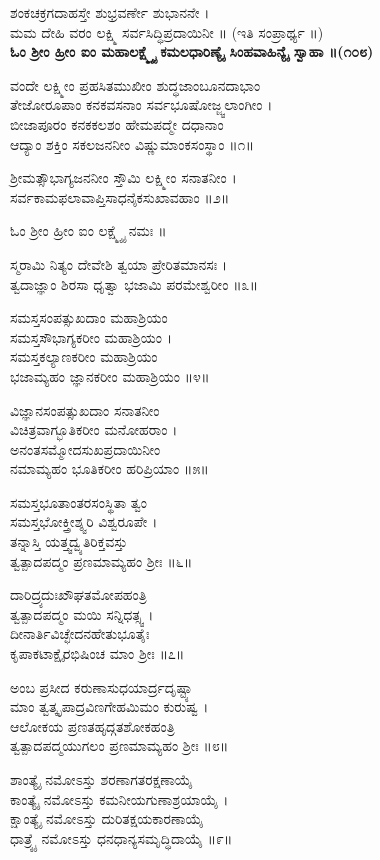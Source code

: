 ಶಂಕಚಕ್ರಗದಾಹಸ್ತೇ ಶುಭ್ರವರ್ಣೇ ಶುಭಾನನೇ ।\\
ಮಮ ದೇಹಿ ವರಂ ಲಕ್ಷ್ಮಿ ಸರ್ವಸಿದ್ಧಿಪ್ರದಾಯಿನೀ ॥
	(ಇತಿ ಸಂಪ್ರಾರ್ಥ್ಯ ॥)\\
{\bfseries ಓಂ ಶ್ರೀಂ ಹ್ರೀಂ ಐಂ ಮಹಾಲಕ್ಷ್ಮ್ಯೈ ಕಮಲಧಾರಿಣ್ಯೈ ಸಿಂಹವಾಹಿನ್ಯೈ ಸ್ವಾಹಾ ॥(೧೦೮)}

ವಂದೇ ಲಕ್ಷ್ಮೀಂ ಪ್ರಹಸಿತಮುಖೀಂ ಶುದ್ಧಜಾಂಬೂನದಾಭಾಂ\\
ತೇಜೋರೂಪಾಂ ಕನಕವಸನಾಂ ಸರ್ವಭೂಷೋಜ್ಜ್ವಲಾಂಗೀಂ ।\\
	ಬೀಜಾಪೂರಂ ಕನಕಕಲಶಂ ಹೇಮಪದ್ಮೇ ದಧಾನಾಂ\\
	ಆದ್ಯಾಂ ಶಕ್ತಿಂ ಸಕಲಜನನೀಂ ವಿಷ್ಣುಮಾಂಕಸಂಸ್ಥಾಂ ॥೧॥

ಶ್ರೀಮತ್ಸೌಭಾಗ್ಯಜನನೀಂ ಸ್ತೌಮಿ ಲಕ್ಷ್ಮೀಂ ಸನಾತನೀಂ ।\\
ಸರ್ವಕಾಮಫಲಾವಾಪ್ತಿಸಾಧನೈಕಸುಖಾವಹಾಂ ॥೨॥

	ಓಂ ಶ್ರೀಂ ಹ್ರೀಂ ಐಂ ಲಕ್ಷ್ಮ್ಯೈ ನಮಃ ॥

	ಸ್ಮರಾಮಿ ನಿತ್ಯಂ ದೇವೇಶಿ ತ್ವಯಾ ಪ್ರೇರಿತಮಾನಸಃ ।\\
	ತ್ವದಾಜ್ಞಾಂ ಶಿರಸಾ ಧೃತ್ವಾ ಭಜಾಮಿ ಪರಮೇಶ್ವರೀಂ ॥೩॥

ಸಮಸ್ತಸಂಪತ್ಸುಖದಾಂ ಮಹಾಶ್ರಿಯಂ \\ಸಮಸ್ತಸೌಭಾಗ್ಯಕರೀಂ ಮಹಾಶ್ರಿಯಂ ।\\
ಸಮಸ್ತಕಲ್ಯಾಣಕರೀಂ ಮಹಾಶ್ರಿಯಂ\\ ಭಜಾಮ್ಯಹಂ ಜ್ಞಾನಕರೀಂ ಮಹಾಶ್ರಿಯಂ ॥೪॥

	ವಿಜ್ಞಾನಸಂಪತ್ಸುಖದಾಂ ಸನಾತನೀಂ \\ವಿಚಿತ್ರವಾಗ್ಭೂತಿಕರೀಂ ಮನೋಹರಾಂ ।\\
	ಅನಂತಸಮ್ಮೋದಸುಖಪ್ರದಾಯಿನೀಂ\\ ನಮಾಮ್ಯಹಂ ಭೂತಿಕರೀಂ ಹರಿಪ್ರಿಯಾಂ ॥೫॥

ಸಮಸ್ತಭೂತಾಂತರಸಂಸ್ಥಿತಾ ತ್ವಂ\\ ಸಮಸ್ತಭೋಕ್ತ್ರೀಶ್ಶ್ವರಿ ವಿಶ್ವರೂಪೇ ।\\
ತನ್ನಾಸ್ತಿ ಯತ್ತ್ವದ್ವ್ಯತಿರಿಕ್ತವಸ್ತು \\ತ್ವತ್ಪಾದಪದ್ಮಂ ಪ್ರಣಮಾಮ್ಯಹಂ ಶ್ರೀಃ ॥೬॥

	ದಾರಿದ್ರ್ಯದುಃಖೌಘತಮೋಪಹಂತ್ರಿ\\ ತ್ವತ್ಪಾದಪದ್ಮಂ ಮಯಿ ಸನ್ನಿಧತ್ಸ್ವ ।\\
	ದೀನಾರ್ತಿವಿಚ್ಛೇದನಹೇತುಭೂತೈಃ \\ಕೃಪಾಕಟಾಕ್ಷೈರಭಿಷಿಂಚ ಮಾಂ ಶ್ರೀಃ ॥೭॥

ಅಂಬ ಪ್ರಸೀದ ಕರುಣಾಸುಧಯಾರ್ದ್ರದೃಷ್ಟ್ಯಾ \\ಮಾಂ ತ್ವತ್ಕೃಪಾದ್ರವಿಣಗೇಹಮಿಮಂ ಕುರುಷ್ವ ।\\
ಆಲೋಕಯ ಪ್ರಣತಹೃದ್ಗತಶೋಕಹಂತ್ರಿ \\ತ್ವತ್ಪಾದಪದ್ಮಯುಗಲಂ ಪ್ರಣಮಾಮ್ಯಹಂ ಶ್ರೀಃ ॥೮॥

	ಶಾಂತ್ಯೈ ನಮೋಽಸ್ತು ಶರಣಾಗತರಕ್ಷಣಾಯೈ\\ ಕಾಂತ್ಯೈ ನಮೋಽಸ್ತು ಕಮನೀಯಗುಣಾಶ್ರಯಾಯೈ ।\\
	ಕ್ಷಾಂತ್ಯೈ ನಮೋಽಸ್ತು ದುರಿತಕ್ಷಯಕಾರಣಾಯೈ \\ಧಾತ್ರ್ಯೈ ನಮೋಽಸ್ತು ಧನಧಾನ್ಯಸಮೃದ್ಧಿದಾಯೈ ॥೯॥


